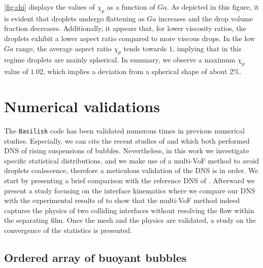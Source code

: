 \documentclass[11pt]{My_preprint}
\begin{document}
\ref{fig:chi} displays the values of $\chi_p$ as a function of $Ga$.
As depicted in this figure, it is evident that droplets undergo flattening as $Ga$ increases and the drop volume fraction decreases. 
Additionally, it appears that, for lower viscosity ratios, the droplets exhibit a lower aspect ratio compared to more viscous drops.
In the low $Ga$ range, the average aspect ratio $\chi_p$ tends towards $1$, implying that in this regime droplets are mainly spherical. 
In summary, we observe a maximum $\chi_p$ value of $1.02$, which implies a deviation from a spherical shape of about $2\%$.






 \section{Numerical validations}
\label{ap:validation}
The \texttt{Basilisk} code has been validated numerous times in previous numerical studies. 
Especially, we can cite the recent studies of \citet{innocenti2020direct} and \citet{hidman2023assessing} which both performed DNS of rising suspensions of bubbles. 
Nevertheless, in this work we investigate specific statistical distributions,
and we make use of a multi-VoF method to avoid droplets coalescence, therefore a meticulous validation of the DNS is in order. 
We start by presenting a brief comparison with the reference DNS of \citet{esmaeeli1999direct}. 
Afterward we present a study focusing on the interface kinematics where we compare our DNS with the experimental results of \citet{mohamed2003drop} to show that the multi-VoF method indeed captures the physics of two colliding interfaces without resolving the flow within the separating film. 
Once the mesh and the physics are validated, a study on the convergence of the statistics is presented. 

\subsection{Ordered array of buoyant bubbles}
\end{document}
